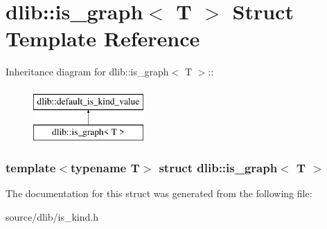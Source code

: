 \hypertarget{structdlib_1_1is__graph}{
\section{dlib::is\_\-graph$<$ T $>$ Struct Template Reference}
\label{structdlib_1_1is__graph}
}
Inheritance diagram for dlib::is\_\-graph$<$ T $>$::\begin{figure}[H]
\begin{center}
\leavevmode
\includegraphics[height=2cm]{structdlib_1_1is__graph}
\end{center}
\end{figure}
\subsubsection*{template$<$typename T$>$ struct dlib::is\_\-graph$<$ T $>$}



The documentation for this struct was generated from the following file:\begin{DoxyCompactItemize}
\item 
source/dlib/is\_\-kind.h\end{DoxyCompactItemize}
